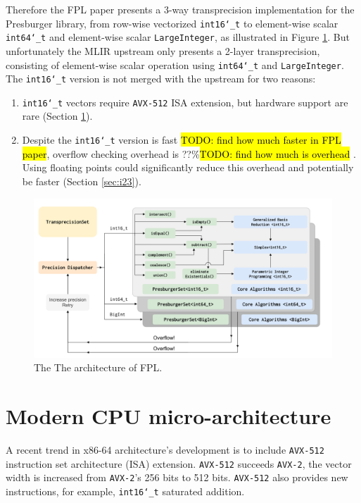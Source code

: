 \documentclass[logo,bsc,singlespacing,parskip]{infthesis}
\newcommand{\dtshort}{\texttt{int16\char`_t}}
\newcommand{\dtlong}{\texttt{int64\char`_t}}
\newenvironment{compactlist}
{ \begin{enumerate}
    \setlength{\itemsep}{0pt}
    \setlength{\parskip}{0pt}
    \setlength{\parsep}{0pt}     
}
{ \end{enumerate} }
\begin{document}
Therefore the FPL paper presents a 3-way transprecision implementation for the
Presburger library, from row-wise vectorized \dtshort{} to element-wise
scalar \dtlong{} and element-wise scalar \texttt{LargeInteger}, as
illustrated in Figure \ref{fig:fpl_arch}. But unfortunately the MLIR upstream
only presents a 2-layer transprecision, consisting of element-wise scalar
operation using \dtlong{} and \texttt{LargeInteger}. The
\dtshort{} version is not merged with the upstream for two reasons: 
\begin{compactlist} 
    \item \dtshort{} vectors require \texttt{AVX-512} ISA extension, but hardware
    support are rare (Section \ref{sec:avx512}). 
    \item Despite the \dtshort{} version is fast \hl{TODO: find how much
    faster in FPL paper}, overflow checking overhead is ??\%\hl{TODO: find how
    much is overhead} \cite{FPL2}. Using floating points could significantly
    reduce this overhead and potentially be faster (Section \ref{sec:i23}).  
\end{compactlist}


\begin{figure}
    \includegraphics[width=\linewidth]{image/transprecision.png}
    \caption{The The architecture of FPL.}
    \label{fig:fpl_arch}
\end{figure}

\section{Modern CPU micro-architecture}
\label{sec:avx512}

A recent trend in x86-64 architecture’s development is to include \texttt{AVX-512}
instruction set architecture (ISA) extension. \texttt{AVX-512} succeeds \texttt{AVX-2}, the vector
width is increased from \texttt{AVX-2}’s 256 bits to 512 bits. \texttt{AVX-512} also provides new
instructions, for example, \dtshort{} saturated addition.
\end{document}
